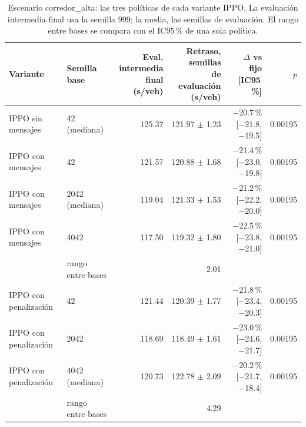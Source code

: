 \begin{table}[H]
\centering
\scriptsize
\setlength{\tabcolsep}{3pt}
\begin{tabular}{llrrrr}
\toprule
Variante & Semilla base & \makecell{Eval. intermedia\\final (s/veh)} & \makecell{Retraso, semillas\\de evaluación (s/veh)} & $\Delta$ vs fijo [IC95\,\%] & $p$ \\
\midrule
IPPO sin mensajes & 42 (mediana) & 125.37 & 121.97 $\pm$ 1.23 & $-$20.7\,\% [$-$21.8, $-$19.5] & 0.00195 \\
IPPO con mensajes & 42 & 121.57 & 120.88 $\pm$ 1.68 & $-$21.4\,\% [$-$23.0, $-$19.8] & 0.00195 \\
IPPO con mensajes & 2042 (mediana) & 119.04 & 121.33 $\pm$ 1.53 & $-$21.2\,\% [$-$22.2, $-$20.0] & 0.00195 \\
IPPO con mensajes & 4042 & 117.50 & 119.32 $\pm$ 1.80 & $-$22.5\,\% [$-$23.8, $-$21.0] & 0.00195 \\
 & rango entre bases & & 2.01 & & \\
IPPO con penalización & 42 & 121.44 & 120.39 $\pm$ 1.77 & $-$21.8\,\% [$-$23.4, $-$20.3] & 0.00195 \\
IPPO con penalización & 2042 & 118.69 & 118.49 $\pm$ 1.61 & $-$23.0\,\% [$-$24.6, $-$21.7] & 0.00195 \\
IPPO con penalización & 4042 (mediana) & 120.73 & 122.78 $\pm$ 2.09 & $-$20.2\,\% [$-$21.7, $-$18.4] & 0.00195 \\
 & rango entre bases & & 4.29 & & \\
\bottomrule
\end{tabular}
\caption[Escenario corredor\_alta: fragilidad del entrenamiento IPPO]{Escenario corredor\_alta: las tres políticas de cada variante IPPO. La evaluación intermedia final usa la semilla 999; la media, las semillas de evaluación. El rango entre bases se compara con el IC95\,\% de una sola política.}
\label{tab:corredor_alta-fragilidad}
\end{table}
